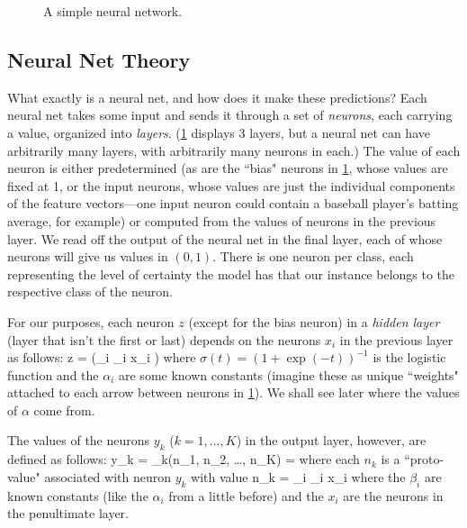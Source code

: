 \documentclass[10pt]{article}
\DeclareMathOperator{\softmax}{softmax}
\begin{document}
\begin{figure}[htbp]
\centering

\caption{A simple neural network.}
\label{fig:neuralnet}
\end{figure}


\subsection{Neural Net Theory}

What exactly is a neural net, and how does it make these predictions?
Each neural net takes some input and sends it through a set of \emph{neurons}, each carrying a value, organized into \emph{layers}.
(\cref{fig:neuralnet} displays 3 layers, but a neural net can have arbitrarily many layers, with arbitrarily many neurons in each.)
The value of each neuron is either predetermined (as are the ``bias" neurons in \cref{fig:neuralnet}, whose values are fixed at 1, or the input neurons, whose values are just the individual components of the feature vectors---one input neuron could contain a baseball player's batting average, for example) or computed from the values of neurons in the previous layer.
We read off the output of the neural net in the final layer, each of whose neurons will give us values in $(0, 1)$. There is one neuron per class, each representing the level of certainty the model has that our instance belongs to the respective class of the neuron.

For our purposes, each neuron $z$ (except for the bias neuron) in a \emph{hidden layer} (layer that isn't the first or last) depends on the neurons $x_i$ in the previous layer as follows:
\beq
\label{eq:hiddenlayer}
z = \sigma\left(\sum_i \alpha_i x_i \right)
\eeq
where $\sigma(t) = (1 + \exp(-t))^{-1}$ is the logistic function and the $\alpha_i$ are some known constants (imagine these as unique ``weights" attached to each arrow between neurons in \cref{fig:neuralnet}).
We shall see later where the values of $\alpha$ come from.

The values of the neurons $y_k$ ($k = 1, \dots, K$) in the output layer, however, are defined as follows:
\beq
y_k = \softmax_k(n_1, n_2, \dots, n_K) = 
\eeq
where each $n_k$ is a ``proto-value" associated with neuron $y_k$ with value
\beq
\label{eq:netvalue}
n_k = \sum_i \beta_i x_i
\eeq
where the $\beta_i$ are known constants (like the $\alpha_i$ from a little before) and the $x_i$ are the neurons in the penultimate layer.
\end{document}

